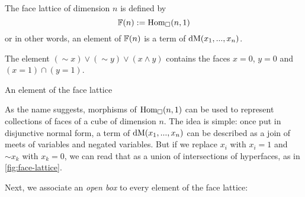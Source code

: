 \begin{definition}
    The face lattice of dimension \( n \) is defined by
    \[
        \faces(n) := \hom[\catCube]{n}{1}
    \]
    or in other words, an element of \( \faces(n) \) is a term of
    \( \demorgan{x_1 , ... , x_n} \).
\end{definition}
% 
\begin{marginfigure}


\begin{small}
The element \( ({\sim} x) \lor ({\sim} y) \lor (x \land y) \) contains the
faces \( x = 0 \), \( y = 0 \) and \( (x = 1) \cap (y = 1) \).
\end{small}
\caption{An element of the face lattice}
    \label{fig:face-lattice}
\end{marginfigure}
% 
As the name suggests, morphisms of \( \hom[\catCube]{n}{1} \) can be used to
represent collections of faces of a cube of dimension \( n \). 
% 
The idea is simple: once put in disjunctive normal form, a term of 
\( \demorgan{x_1 , ... , x_n} \) can be described as a join of meets
of variables and negated variables.
% 
But if we replace \( x_i \) with \( x_i = 1 \) and \( {\sim} x_k \) with
\( x_k = 0 \), we can read that as a union of intersections of hyperfaces,
as in \cref{fig:face-lattice}.

Next, we associate an \emph{open box} to every element of the face lattice:


